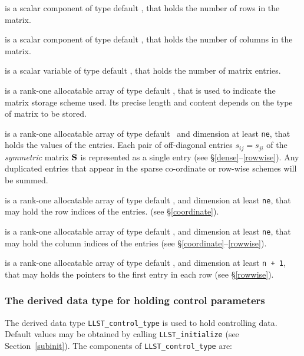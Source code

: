 \documentclass{galahad}
\newcommand{\packagename}{LLST}
\begin{document}
\begin{description}

 is a scalar component of type default \integer,
that holds the number of rows in the matrix.

 is a scalar component of type default \integer,
that holds the number of columns in the matrix.

 is a scalar variable of type default \integer, that
holds the number of matrix entries.

 is a rank-one allocatable array of type default \character, that
is used to indicate the matrix storage scheme used. Its precise length and
content depends on the type of matrix to be stored.

 is a rank-one allocatable array of type default \realdp\,
and dimension at least {\tt ne}, that holds the values of the entries.
Each pair of off-diagonal entries $s_{ij} = s_{ji}$ of the {\em symmetric}
matrix ${\mathbf{S}}$ is represented as a single entry
(see \S\ref{dense}--\ref{rowwise}).
Any duplicated entries that appear in the sparse
co-ordinate or row-wise schemes will be summed.

 is a rank-one allocatable array of type default \integer,
and dimension at least {\tt ne}, that may hold the row indices of the entries.
(see \S\ref{coordinate}).

 is a rank-one allocatable array of type default \integer,
and dimension at least {\tt ne}, that may hold the column indices of the entries
(see \S\ref{coordinate}--\ref{rowwise}).

 is a rank-one allocatable array of type default \integer,
and dimension at least {\tt n + 1}, that may holds the pointers to
the first entry in each row (see \S\ref{rowwise}).

\end{description}


\subsubsection{The derived data type for holding control
 parameters}\label{typecontrol}
The derived data type
{\tt \packagename\_control\_type}
is used to hold controlling data. Default values may be obtained by calling
{\tt \packagename\_initialize}
(see Section~\ref{subinit}). The components of
{\tt \packagename\_control\_type}
are:
\end{document}
